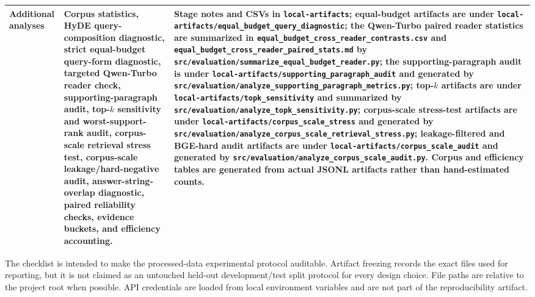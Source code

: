 \begin{table}[t]
\begin{threeparttable}
\begin{tabularx}{\textwidth}{>{\raggedright\arraybackslash}p{}
                            >{\raggedright\arraybackslash}p{}
                            >{\raggedright\arraybackslash}X}
Additional analyses & Corpus statistics, HyDE query-composition diagnostic, strict equal-budget query-form diagnostic, targeted Qwen-Turbo reader check, supporting-paragraph audit, top-$k$ sensitivity and worst-support-rank audit, corpus-scale retrieval stress test, corpus-scale leakage/hard-negative audit, answer-string-overlap diagnostic, paired reliability checks, evidence buckets, and efficiency accounting. & Stage notes and CSVs in \texttt{local-artifacts}; equal-budget artifacts are under \texttt{local-artifacts/equal\_budget\_query\_diagnostic}; the Qwen-Turbo paired reader statistics are summarized in \texttt{equal\_budget\_cross\_reader\_contrasts.csv} and \texttt{equal\_budget\_cross\_reader\_paired\_stats.md} by \texttt{src/evaluation/summarize\_equal\_budget\_reader.py}; the supporting-paragraph audit is under \texttt{local-artifacts/supporting\_paragraph\_audit} and generated by \texttt{src/evaluation/analyze\_supporting\_paragraph\_metrics.py}; top-$k$ artifacts are under \texttt{local-artifacts/topk\_sensitivity} and summarized by \texttt{src/evaluation/analyze\_topk\_sensitivity.py}; corpus-scale stress-test artifacts are under \texttt{local-artifacts/corpus\_scale\_stress} and generated by \texttt{src/evaluation/analyze\_corpus\_scale\_retrieval\_stress.py}; leakage-filtered and BGE-hard audit artifacts are under \texttt{local-artifacts/corpus\_scale\_audit} and generated by \texttt{src/evaluation/analyze\_corpus\_scale\_audit.py}. Corpus and efficiency tables are generated from actual JSONL artifacts rather than hand-estimated counts. \\
\bottomrule
\end{tabularx}
\begin{tablenotes}
\footnotesize
\item The checklist is intended to make the processed-data experimental protocol auditable. Artifact freezing records the exact files used for reporting, but it is not claimed as an untouched held-out development/test split protocol for every design choice. File paths are relative to the project root when possible. API credentials are loaded from local environment variables and are not part of the reproducibility artifact.
\end{tablenotes}
\end{threeparttable}
\end{table}
